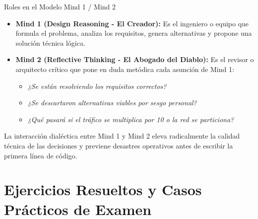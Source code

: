 \begin{definicion}{Roles en el Modelo Mind 1 / Mind 2}
\begin{itemize}[leftmargin=1.5em]
  \item \textbf{Mind 1 (Design Reasoning - El Creador):} Es el ingeniero o equipo que formula el problema, analiza los requisitos, genera alternativas y propone una solución técnica lógica.
  \item \textbf{Mind 2 (Reflective Thinking - El Abogado del Diablo):} Es el revisor o arquitecto crítico que pone en duda metódica cada asunción de Mind 1:
    \begin{itemize}
      \item \emph{¿Se están resolviendo los requisitos correctos?}
      \item \emph{¿Se descartaron alternativas viables por sesgo personal?}
      \item \emph{¿Qué pasará si el tráfico se multiplica por 10 o la red se particiona?}
    \end{itemize}
\end{itemize}
\end{definicion}

La interacción dialéctica entre Mind 1 y Mind 2 eleva radicalmente la calidad técnica de las decisiones y previene desastres operativos antes de escribir la primera línea de código.

\section{Ejercicios Resueltos y Casos Prácticos de Examen}
\label{sec:ejercicios-tema3}

